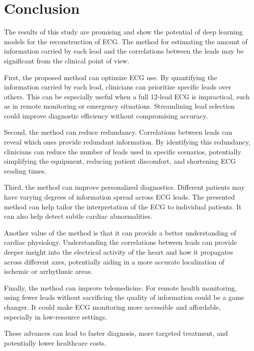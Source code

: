 \documentclass[preprint,12pt]{elsarticle}
\begin{document}
\section{Conclusion}

The results of this study are promising and show the potential of deep learning models for the reconstruction of ECG. The method for estimating the amount of information carried by each lead and the correlations between the leads may be significant from the clinical point of view. 

First, the proposed method can optimize ECG use. By quantifying the information carried by each lead, clinicians can prioritize specific leads over others. This can be especially useful when a full 12-lead ECG is impractical, such as in remote monitoring or emergency situations. Streamlining lead selection could improve diagnostic efficiency without compromising accuracy. 

Second, the method can reduce redundancy. Correlations between leads can reveal which ones provide redundant information. By identifying this redundancy, clinicians can reduce the number of leads used in specific scenarios, potentially simplifying the equipment, reducing patient discomfort, and shortening ECG reading times.

Third, the method can improve personalized diagnostics. Different patients may have varying degrees of information spread across ECG leads. The presented method can help tailor the interpretation of the ECG to individual patients. It can also help detect subtle cardiac abnormalities.

Another value of the method is that it can provide a better understanding of cardiac physiology. Understanding the correlations between leads can provide deeper insight into the electrical activity of the heart and how it propagates across different axes, potentially aiding in a more accurate localization of ischemic or arrhythmic areas.

Finally, the method can improve telemedicine. For remote health monitoring, using fewer leads without sacrificing the quality of information could be a game changer. It could make ECG monitoring more accessible and affordable, especially in low-resource settings.

These advances can lead to faster diagnosis, more targeted treatment, and potentially lower healthcare costs.


  
 
\end{document}
